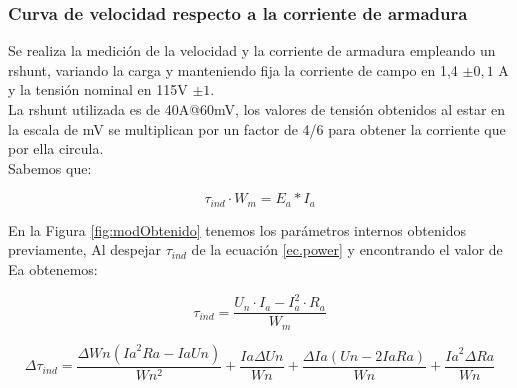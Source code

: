 \documentclass[11pt,letterpaper]{article}     %
\begin{document}
\subsubsection{Curva de velocidad respecto a la corriente de armadura}
	Se realiza la medición de la velocidad y la corriente de armadura empleando un rshunt, variando la carga y manteniendo fija la corriente de campo en 1,4 $\pm0,1$ A y la tensión nominal en 115V $\pm1$.\\
	
		La rshunt utilizada es de 40A@60mV, los valores de tensión obtenidos al estar en la escala de mV se multiplican por un factor de 4/6 para obtener la corriente que por ella circula.\\
		
		Sabemos que:
		
		\begin{equation}
			\tau_{ind}\cdot W_m = E_a*I_a 
			\label{ec.power}
		\end{equation}
		
		En la Figura \ref{fig:modObtenido} tenemos los parámetros internos obtenidos previamente, Al despejar $\tau_{ind}$ de la ecuación \ref{ec.power} y encontrando el valor de Ea obtenemos:
		
		\begin{equation}
			\tau_{ind}=\frac{U_n\cdot I_a-I_a^2\cdot R_a}{W_m}
		\end{equation}
		
		\begin{equation}
		\Delta \tau_{ind}=	\frac{\Delta Wn {\left({Ia}^2  Ra-Ia Un\right)}}{Wn^{2}}+\frac{Ia \Delta Un}{Wn}+\frac{ \Delta Ia {\left({Un}-2 {Ia} {Ra}\right)}}{{Wn}}+\frac{{Ia}^2 {\Delta Ra}}{Wn}
		\end{equation}
		
\end{document}
